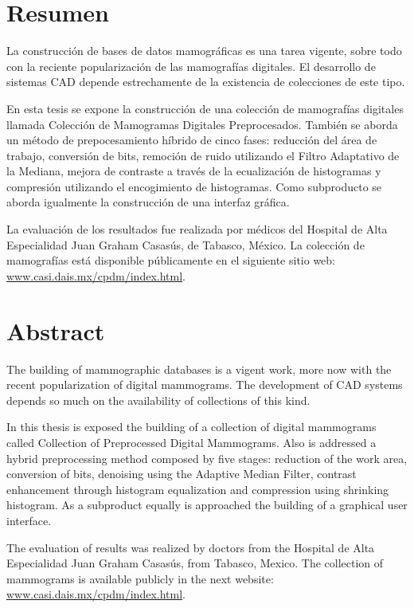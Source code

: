 \newpage
{}
\chapter*{Resumen}

La construcción de bases de datos mamográficas es una tarea vigente, sobre todo
con la reciente popularización de las mamografías digitales. El desarrollo de
sistemas CAD depende estrechamente de la existencia de colecciones de este
tipo.

En esta tesis se expone la construcción de una colección de mamografías
digitales llamada Colección de Mamogramas Digitales Preprocesados. También se
aborda un método de prepocesamiento híbrido de cinco fases: reducción del área
de trabajo, conversión de bits, remoción de ruido utilizando el Filtro
Adaptativo de la Mediana, mejora de contraste a través de la ecualización de
histogramas y compresión utilizando el encogimiento de histogramas. Como
subproducto se aborda igualmente la construcción de una interfaz gráfica.

La evaluación de los resultados fue realizada por médicos del Hospital de Alta
Especialidad Juan Graham Casasús, de Tabasco, México. La colección de
mamografías está disponible públicamente en el siguiente sitio web:
\url{www.casi.dais.mx/cpdm/index.html}.

\newpage
{}
\chapter*{Abstract}

The building of mammographic databases is a vigent work, more now with the
recent popularization of digital mammograms. The development of CAD systems
depends so much on the availability of collections of this kind.

In this thesis is exposed the building of a collection of digital mammograms
called Collection of Preprocessed Digital Mammograms. Also is addressed a
hybrid preprocessing method composed by five stages: reduction of the work
area, conversion of bits, denoising using the Adaptive Median Filter, contrast
enhancement through histogram equalization and compression using shrinking
histogram. As a subproduct equally is approached the building of a graphical
user interface.

The evaluation of results was realized by doctors from the Hospital de Alta
Especialidad Juan Graham Casasús, from Tabasco, Mexico. The collection of
mammograms is available publicly in the next website:
\url{www.casi.dais.mx/cpdm/index.html}.

